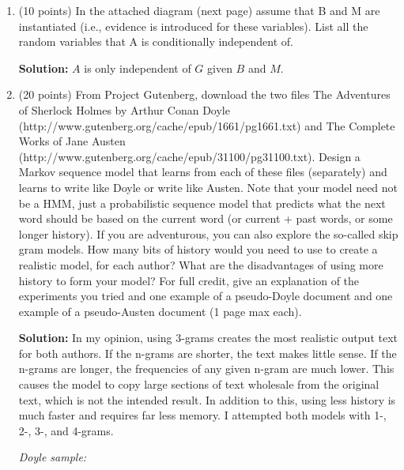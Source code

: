 \documentclass[11pt]{article}
\begin{document}
\begin{enumerate}
\item (10 points) In the attached diagram (next page) assume that B and M are instantiated (i.e., evidence is introduced for these variables). List all the random variables that A is conditionally independent of.

\textbf{Solution:} $A$ is only independent of $G$ given $B$ and $M$.

\item (20 points) From Project Gutenberg, download the two files The Adventures of Sherlock Holmes by Arthur Conan Doyle (http://www.gutenberg.org/cache/epub/1661/pg1661.txt) and The Complete Works of Jane Austen (http://www.gutenberg.org/cache/epub/31100/pg31100.txt). Design a Markov sequence model that learns from each of these files (separately) and learns to write like Doyle or write like Austen. Note that your model need not be a HMM, just a probabilistic sequence model that predicts what the next word should be based on the current word (or current + past words, or some longer history). If you are adventurous, you can also explore the so-called skip gram models. How many bits of history would you need to use to create a realistic model, for each author? What are the disadvantages of using more history to form your model? For full credit, give an explanation of the experiments you tried and one example of a pseudo-Doyle document and one example of a pseudo-Austen document (1 page max each).

\textbf{Solution:} In my opinion, using 3-grams creates the most realistic output text for both authors. If the n-grams are shorter, the text makes little sense. If the n-grams are longer, the frequencies of any given n-gram are much lower. This causes the model to copy large sections of text wholesale from the original text, which is not the intended result. In addition to this, using less history is much faster and requires far less memory. I attempted both models with 1-, 2-, 3-, and 4-grams.

\textit{Doyle sample:}


\end{enumerate}
\end{document}
